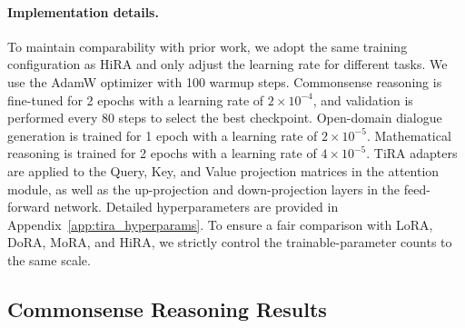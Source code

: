 \documentclass[a4paper,11pt]{article}
\begin{document}
\paragraph{Implementation details.}
To maintain comparability with prior work, we adopt the same training configuration as HiRA and only adjust the learning rate for different tasks. We use the AdamW optimizer with 100 warmup steps. Commonsense reasoning is fine-tuned for 2 epochs with a learning rate of $2\times10^{-4}$, and validation is performed every 80 steps to select the best checkpoint. Open-domain dialogue generation is trained for 1 epoch with a learning rate of $2\times10^{-5}$. Mathematical reasoning is trained for 2 epochs with a learning rate of $4\times10^{-5}$. TiRA adapters are applied to the Query, Key, and Value projection matrices in the attention module, as well as the up-projection and down-projection layers in the feed-forward network. Detailed hyperparameters are provided in Appendix~\ref{app:tira_hyperparams}. To ensure a fair comparison with LoRA, DoRA, MoRA, and HiRA, we strictly control the trainable-parameter counts to the same scale.

\subsection{Commonsense Reasoning Results}
\end{document}
